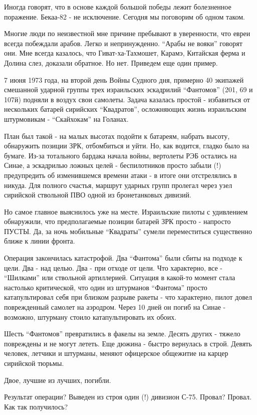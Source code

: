 Иногда говорят, что в основе каждой большой победы лежит болезненное поражение. Бекаа-82 - не исключение. Сегодня мы поговорим об одном таком.

Многие люди по неизвестной мне причине пребывают в уверенности, что евреи всегда побеждали арабов. Легко и непринужденно. “Арабы не вояки” говорят они. Мне всегда казалось, что Гиват-ха-Тахмошет, Карамэ, Китайская ферма и Долина слез, доказали обратное. Но нет. Приведем еще один пример.

7 июня 1973 года, на второй день Войны Судного дня, примерно 40 экипажей смешанной ударной группы трех израильских эскадрилий “Фантомов” (201, 69 и 107й) подняли в воздух свои самолеты. Задача казалась простой - избавиться от нескольких батарей сирийских “Квадратов”, осложняющих жизнь израильским штурмовикам - “Скайхокам” на Голанах.

План был такой - на малых высотах подойти к батареям, набрать высоту, обнаружить позиции ЗРК, отбомбиться и уйти. Но, как водится, гладко было на бумаге. Из-за тотального бардака начала войны, вертолеты РЭБ остались на Синае, а эскадрилью ложных целей - беспилотников просто забыли (!) предупредить об изменившемся времени атаки - в итоге они отстрелялись в никуда. Для полного счастья, маршрут ударных групп пролегал через узел сирийской ствольной ПВО одной из бронетанковых дивизий.

Но самое главное выяснилось уже на месте. Израильские пилоты с удивлением обнаружили, что предполагаемые позиции батарей ЗРК просто - напросто ПУСТЫ. Да, за ночь мобильные “Квадраты” сумели переместиться существенно ближе к линии фронта.

Операция закончилась катастрофой. Два “Фантома” были сбиты на подходе к цели. Два - над целью. Два - при отходе от цели. Что характерно, все - “Шилками” или ствольной артиллерией. Ситуация в какой-то момент стала настолько критической, что один из штурманов “Фантома” просто катапультировал себя при близком разрыве ракеты - что характерно, пилот довел поврежденный самолет на аэродром. Через 10 дней он погиб на Синае - возможно, штурману стоило катапультировать их обоих.

Шесть “Фантомов” превратились в факелы на земле. Десять других - тяжело повреждены и не могут лететь. Еще дюжина - быстро вернулась в строй. Девять человек, летчики и штурманы, меняют офицерское общежитие на карцер сирийской тюрьмы.

Двое, лучшие из лучших, погибли.

Результат операции? Выведен из строя один (!) дивизион С-75.
Провал? Провал. Как так получилось?

